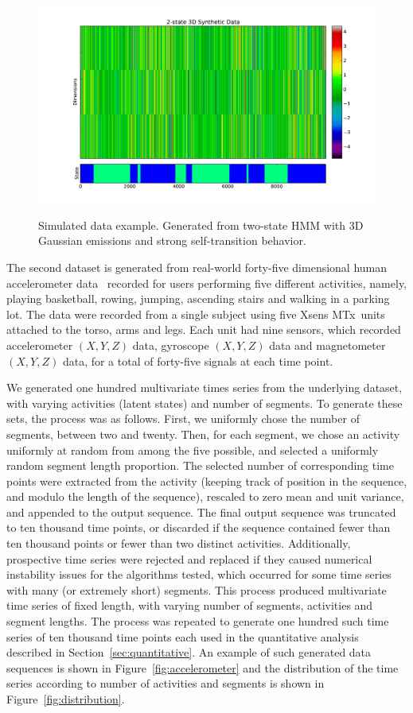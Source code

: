 \documentclass[letterpaper]{article}
\begin{document}
\begin{figure}[htbp]
  \caption{Simulated data example. Generated from two-state HMM with 3D Gaussian emissions and strong self-transition behavior.}
  \centering
    \includegraphics[width=1.\linewidth]{images/3D_synthetic_data_example.pdf}
    \label{fig:simulated}
\end{figure}
The second dataset is generated from real-world forty-five dimensional human accelerometer data~\cite{Altun:2010:CSC:1823245.1823314} recorded for users performing five different activities, namely, playing basketball, rowing, jumping, ascending stairs and walking in a parking lot. The data were recorded from a single subject using five Xsens MTx\texttrademark\ units attached to the torso, arms and legs. Each unit had nine sensors, which recorded accelerometer $(X, Y, Z)$ data, gyroscope $(X,Y,Z)$ data and magnetometer $(X,Y,Z)$ data, for a total of forty-five signals at each time point.

We generated one hundred multivariate times series from the underlying dataset, with varying activities (latent states) and number of segments. To generate these sets, the process was as follows. First, we uniformly chose the number of segments, between two and twenty. Then, for each segment, we chose an activity uniformly at random from among the five possible, and selected a uniformly random segment length proportion. The selected number of corresponding time points were extracted from the activity (keeping track of position in the sequence, and modulo the length of the sequence), rescaled to zero mean and unit variance, and appended to the output sequence. The final output sequence was truncated to ten thousand time points, or discarded if the sequence contained fewer than ten thousand points or fewer than two distinct activities. Additionally, prospective time series were rejected and replaced if they caused numerical instability issues for the algorithms tested, which occurred for some time series with many (or extremely short) segments. This process produced multivariate time series of fixed length, with varying number of segments, activities and segment lengths. The process was repeated to generate one hundred such time series of ten thousand time points each used in the quantitative analysis described in Section~\ref{sec:quantitative}. An example of such generated data sequences is shown in Figure~\ref{fig:accelerometer} and the distribution of the time series according to number of activities and segments is shown in Figure~\ref{fig:distribution}.
\end{document}
